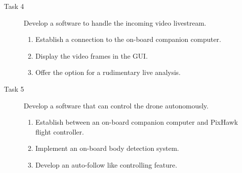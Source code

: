 \begin{description}
    \item[Task 4] Develop a software to handle the incoming video livestream.
    \begin{enumerate}
        \item Establish a connection to the on-board companion computer.
        \item Display the video frames in the \acs*{GUI}.
        \item Offer the option for a rudimentary live analysis.
    \end{enumerate}
    \item[Task 5] Develop a software that can control the drone autonomously.
    \begin{enumerate}
        \item Establish between an on-board companion computer and PixHawk
        flight controller.
        \item Implement an on-board body detection system.
        \item Develop an auto-follow like controlling feature. 
    \end{enumerate}
\end{description}
